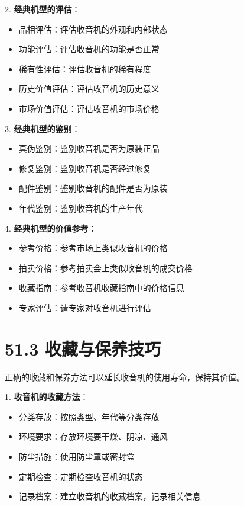 \documentclass[12pt,UTF8]{ctexbook}
\begin{document}
2. \textbf{经典机型的评估}：
   \begin{itemize}[leftmargin=3.5em]
   \item 品相评估：评估收音机的外观和内部状态
   \item 功能评估：评估收音机的功能是否正常
   \item 稀有性评估：评估收音机的稀有程度
   \item 历史价值评估：评估收音机的历史意义
   \item 市场价值评估：评估收音机的市场价格
   \end{itemize}

3. \textbf{经典机型的鉴别}：
   \begin{itemize}[leftmargin=3.5em]
   \item 真伪鉴别：鉴别收音机是否为原装正品
   \item 修复鉴别：鉴别收音机是否经过修复
   \item 配件鉴别：鉴别收音机的配件是否为原装
   \item 年代鉴别：鉴别收音机的生产年代
   \end{itemize}

4. \textbf{经典机型的价值参考}：
   \begin{itemize}[leftmargin=3.5em]
   \item 参考价格：参考市场上类似收音机的价格
   \item 拍卖价格：参考拍卖会上类似收音机的成交价格
   \item 收藏指南：参考收音机收藏指南中的价格信息
   \item 专家评估：请专家对收音机进行评估
   \end{itemize}

\section*{51.3 收藏与保养技巧}

正确的收藏和保养方法可以延长收音机的使用寿命，保持其价值。

1. \textbf{收音机的收藏方法}：
   \begin{itemize}[leftmargin=3.5em]
   \item 分类存放：按照类型、年代等分类存放
   \item 环境要求：存放环境要干燥、阴凉、通风
   \item 防尘措施：使用防尘罩或密封盒
   \item 定期检查：定期检查收音机的状态
   \item 记录档案：建立收音机的收藏档案，记录相关信息
   \end{itemize}
\end{document}
